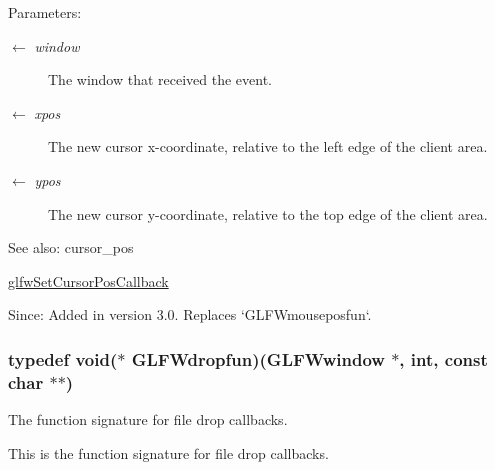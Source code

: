 \begin{Desc}
\item[Parameters:]
\begin{description}
\item[\mbox{$\leftarrow$} {\em window}]The window that received the event. \item[\mbox{$\leftarrow$} {\em xpos}]The new cursor x-coordinate, relative to the left edge of the client area. \item[\mbox{$\leftarrow$} {\em ypos}]The new cursor y-coordinate, relative to the top edge of the client area.\end{description}
\end{Desc}
\begin{Desc}
\item[See also:]cursor\_\-pos 

\hyperlink{group__input_g9c49c0d3d3c775c3124726f1d902124d}{glfwSetCursorPosCallback}\end{Desc}
\begin{Desc}
\item[Since:]Added in version 3.0. Replaces `GLFWmouseposfun`. \end{Desc}
\hypertarget{group__input_gcc95e259ad21d4f666faa6280d4018fd}{
\subsubsection[GLFWdropfun]{\setlength{\rightskip}{0pt plus 5cm}typedef void($\ast$  {\bf GLFWdropfun})({\bf GLFWwindow} $\ast$, int, const char $\ast$$\ast$)}}
\label{group__input_gcc95e259ad21d4f666faa6280d4018fd}


The function signature for file drop callbacks. 

This is the function signature for file drop callbacks.

